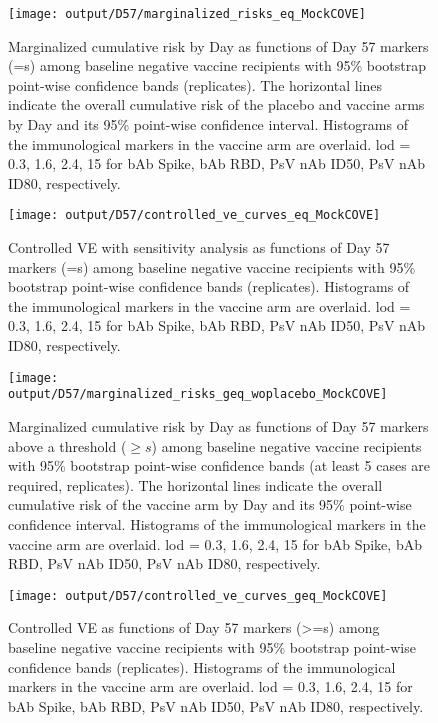 \documentclass[
]{article}
\begin{document}
\begin{figure}[H]
    \centering
    \texttt{[image: output/D57/marginalized\_risks\_eq\_MockCOVE]}
    \caption{Marginalized cumulative risk by Day \protect as functions of Day 57 markers (=s) among baseline negative vaccine recipients with 95\% bootstrap point-wise confidence bands (\protect replicates). The horizontal lines indicate the overall cumulative risk of the placebo and vaccine arms by Day \protect and its 95\% point-wise confidence interval. Histograms of the immunological markers in the vaccine arm are overlaid. lod = 0.3, 1.6, 2.4, 15 for bAb Spike, bAb RBD, PsV nAb ID50, PsV nAb ID80, respectively.}
    
\end{figure}

\begin{figure}[H]
    \centering
    \texttt{[image: output/D57/controlled\_ve\_curves\_eq\_MockCOVE]}
    \caption{Controlled VE with sensitivity analysis as functions of Day 57 markers (=s) among baseline negative vaccine recipients with 95\% bootstrap point-wise confidence bands (\protect replicates). Histograms of the immunological markers in the vaccine arm are overlaid. lod = 0.3, 1.6, 2.4, 15 for bAb Spike, bAb RBD, PsV nAb ID50, PsV nAb ID80, respectively.}
\end{figure}

\begin{figure}[H]
    \centering
    \texttt{[image: output/D57/marginalized\_risks\_geq\_woplacebo\_MockCOVE]}
    \caption{Marginalized cumulative risk by Day \protect as functions of Day 57 markers above a threshold ($\geq s$) among baseline negative vaccine recipients with 95\% bootstrap point-wise confidence bands (at least 5 cases are required, \protect replicates). The horizontal lines indicate the overall cumulative risk of the vaccine arm by Day \protect and its 95\% point-wise confidence interval. Histograms of the immunological markers in the vaccine arm are overlaid. lod = 0.3, 1.6, 2.4, 15 for bAb Spike, bAb RBD, PsV nAb ID50, PsV nAb ID80, respectively.}
\end{figure}

\begin{figure}[H]
    \centering
    \texttt{[image: output/D57/controlled\_ve\_curves\_geq\_MockCOVE]}
    \caption{Controlled VE as functions of Day 57 markers (>=s) among baseline negative vaccine recipients with 95\% bootstrap point-wise confidence bands (\protect replicates). Histograms of the immunological markers in the vaccine arm are overlaid. lod = 0.3, 1.6, 2.4, 15 for bAb Spike, bAb RBD, PsV nAb ID50, PsV nAb ID80, respectively.}
\end{figure}
\end{document}
